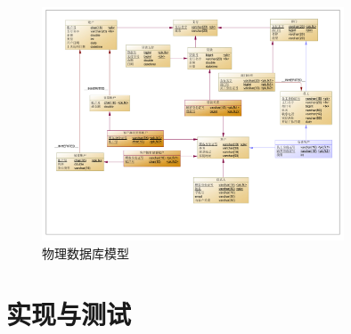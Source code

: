 \documentclass{ctexart}
\begin{document}
\begin{figure}[H]
    \centering
    \includegraphics[width=0.8\textwidth]{assets/er-phys-diagram.pdf}
    \caption{物理数据库模型}
    \label{fig:er-phys-diagram}
\end{figure}

\section{实现与测试}
\end{document}
